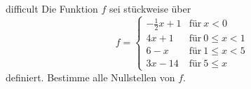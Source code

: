 \documentclass[../abbildungen.tex]{subfiles}
\begin{document}
\begin{exercise}{difficult}
    Die Funktion $f$ sei stückweise über
    \[f=\begin{cases}
        -\frac{1}{2}x+1 & \text{für}~x<0\\
        4x+1 & \text{für}~0\leq x<1\\
        6-x & \text{für}~1\leq x<5\\
        3x-14 & \text{für}~5\leq x
    \end{cases}\]
    definiert. Bestimme alle Nullstellen von $f$.
\end{exercise}
\end{document}

